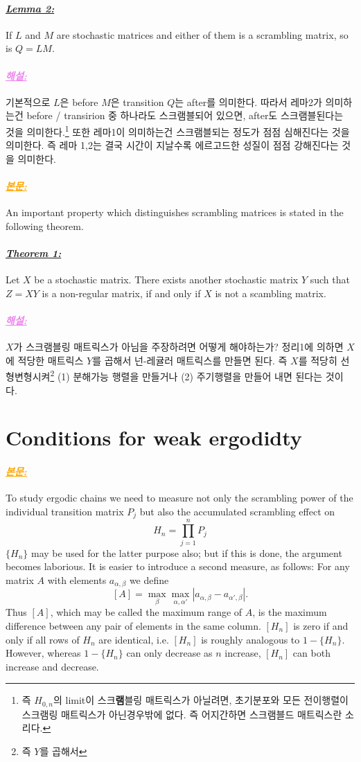 \documentclass[12pt,oneside,english,a4paper]{article}
\newcommand{\para}[1]{\paragraph{\LARGE\it\underline{\textbf{#1:}}}\LARGE}
\newcommand{\paraviolet}[1]{\paragraph{\LARGE\textcolor{violet}{\it\underline{\textbf{#1:}}}}\LARGE}
\newcommand{\paraorange}[1]{\paragraph{\LARGE\textcolor{orange}{\it\underline{\textbf{#1:}}}}\LARGE}
\begin{document}
\para{Lemma 2} If $L$ and $M$ are stochastic matrices and either of them is a scrambling matrix, so is $Q=LM$.

\paraviolet{해설} 기본적으로 $L$은 before $M$은 transition $Q$는 after를 의미한다. 따라서 레마2가 의미하는건 before / transirion 중 하나라도 스크램블되어 있으면, after도 스크램블된다는 것을 의미한다.\footnote{즉 $H_{0,n}$의 limit이 스크{\bf 램}블링 매트릭스가 아닐려면, 초기분포와 모든 전이행렬이 스크램링 매트릭스가 아닌경우밖에 없다. 즉 어지간하면 스크램블드 매트릭스란 소리다.} 또한 레마1이 의미하는건 스크램블되는 정도가 점점 심해진다는 것을 의미한다. 즉 레마 1,2는 결국 시간이 지날수록 에르고드한 성질이 점점 강해진다는 것을 의미한다. 

\paraorange{본문} An important property which distinguishes scrambling matrices is stated in the following theorem.

\para{Theorem 1} Let $X$ be a stochastic matrix. There exists another stochastic matrix $Y$ such that $Z=XY$ is a non-regular matrix, if and only if $X$ is not a scambling matrix.

\paraviolet{해설} $X$가 스크램블링 매트릭스가 아님을 주장하려면 어떻게 해야하는가? 정리1에 의하면 $X$에 적당한 매트릭스 $Y$를 곱해서 넌-레귤러 매트릭스를 만들면 된다. 즉 $X$를 적당히 선형변형시켜\footnote{즉 $Y$를 곱해서} (1) 분해가능 행렬을 만들거나 (2) 주기행렬을 만들어 내면 된다는 것이다. 

\section{Conditions for weak ergodidty}
\paraorange{본문} To study ergodic chains we need to measure not
only the scrambling power of the individual transition matrix $P_j$ but also the accumulated scrambling effect on
\[
H_n=\prod_{j=1}^{n}P_j
\]
$\{H_n\}$ may be used for the latter purpose also; but if this is done, the argument becomes laborious. It is easier to introduce a second measure, as follows:
For any matrix $A$ with elements $a_{\alpha,\beta}$ we define 
\[
[A]=\max_{\beta}\max_{\alpha,\alpha'}|a_{\alpha,\beta}-a_{\alpha',\beta}|.
\]
Thus $[A]$, which may be called the maximum range of $A$, is the maximum difference between any pair of elements in the same column.
$[H_n]$ is zero if and only if all rows of $H_n$ are identical, i.e. $[H_n]$ is roughly analogous to $1-\{H_n\}$. However, whereas $1-\{H_n\}$ can only decrease as $n$ increase, $[H_n]$ can both increase and decrease. 
\end{document}
